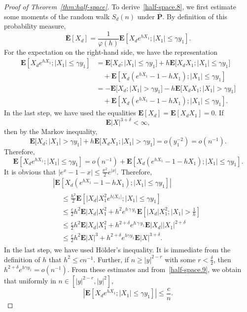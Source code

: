 \documentclass[AHL,Unicode,longabstracts,published]{cedram}
\newcommand{\pr}{\mathbf{P}}
\newcommand{\e}{\mathbf{E}}
\renewcommand{\le}{\leqslant}
\renewcommand{\ge}{\geqslant}
\begin{document}
\begin{proof}[Proof of Theorem~\ref{thm:half-space}]
To derive~\eqref{half-space.8}, we first estimate some moments of the random walk $S_d(n)$ under $\overline{\pr}$. By definition of this probability measure,
\[
\overline{\e}\left[X_d\right]=\frac{1}{\varphi(h)}\e\left[X_de^{hX_1};\left| X_1\right|\le \gamma y_1\right].
\]
For the expectation on the right-hand side, we have the representation
\begin{align*}
\e\left[X_de^{hX_1};|X_1|\le \gamma y_1\right]
&=\e\big[X_d;|X_1|\le \gamma y_1\big]+h\e\big[X_dX_1;|X_1|\le \gamma y_1\big]
\\
&\quad+\e\left[X_d\left(e^{hX_1}-1-hX_1\right);|X_1|\le \gamma y_1\right]\\
&=-\e\big[X_d;|X_1|> \gamma y_1\big]-h\e\big[X_dX_1;|X_1|> \gamma y_1\big]\\
&\quad+\e\left[X_d\left(e^{hX_1}-1-hX_1\right);|X_1|\le \gamma y_1\right].
\end{align*}
In the last step, we have used the equalities $\e[X_d]=\e[X_dX_1]=0$. If
\begin{equation}\label{half-space.9}
\e| X|^{3+\delta}<\infty,
\end{equation}
then by the Markov inequality,
\[
\e\big[X_d;|X_1|> \gamma y_1\big]+h\e\big[X_dX_1;|X_1|> \gamma y_1\big] =o\left(y_1^{-2}\right)=o\left(n^{-1}\right).
\]
Therefore,
\[
\e\left[X_de^{hX_1};|X_1|\le \gamma y_1\right]=o\left(n^{-1}\right)+
\e\left[X_d\left(e^{hX_1}-1-hX_1\right);|X_1|\le \gamma y_1\right].
\]
It is obvious that $|e^x-1-x|\le \frac{x^2}{2}e^{| x|}$. Therefore,
\begin{multline*}
\left|\e\left[X_d\left(e^{hX_1}-1-hX_1\right);|X_1|\le \gamma y_1\right]\right|\\
\begin{aligned}
&\le \frac{h^2}{2}\e\left[|X_d| X_1^2e^{h|X_1|};|X_1|\le\gamma y_1\right]\\
&\le \frac{e}{2}h^2\e|X_d| X_1^2+h^2e^{h\,\gamma\,y_1}\e\left[|X_d| X_1^2;|X_1|>\frac{1}{h}\right]\\
&\le \frac{e}{2}h^2\e|X_d| X_1^2+h^{2+\delta}e^{h\,\gamma\,y_1}\e|X_d| |X_1|^{2+\delta}\\
&\le \frac{e}{2}h^2\e|X|^3 + h^{2+\delta}e^{h\gamma y_1}\e|X|^{3+\delta}.
\end{aligned}
\end{multline*}
In the last step, we have used H\"older's inequality. It is immediate from the definition of $h$ that $h^2\le cn^{-1}$. Further, if $n\ge| y|^{2-r}$ with some $r<\frac{\delta}{2}$, then $h^{2+\delta}e^{h\gamma y_1}=o(n^{-1})$. From these estimates and from~\eqref{half-space.9}, we obtain that uniformly in $n\in[| y|^{2-r},| y|^2]$,
\begin{equation}\label{half-space.10}
\left|\e\left[X_de^{hX_1};|X_1|\le \gamma y_1\right]\right|\le\frac{c}{n}.
\end{equation}



\end{proof}
\end{document}
